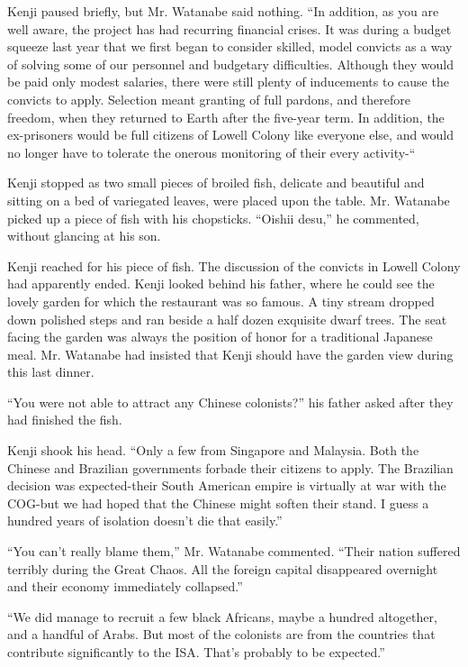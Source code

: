 \documentclass[]{article}
\begin{document}
{Kenji paused briefly, but Mr. Watanabe said nothing. “In addition, as you are well aware, the project has had recurring financial crises. It was during a budget squeeze last year that we first began to consider skilled, model convicts as a way of solving some of our personnel and budgetary difficulties. Although they would be paid only modest salaries, there were still plenty of inducements to cause the convicts to apply. Selection meant granting of full pardons, and therefore freedom, when they returned to Earth after the five-year term. In addition, the ex-prisoners would be full citizens of Lowell Colony like everyone else, and would no longer have to tolerate the onerous monitoring of their every activity-“

Kenji stopped as two small pieces of broiled fish, delicate and beautiful and sitting on a bed of variegated leaves, were placed upon the table. Mr. Watanabe picked up a piece of fish with his chopsticks. “Oishii desu,” he commented, without glancing at his son.

Kenji reached for his piece of fish. The discussion of the convicts in Lowell Colony had apparently ended. Kenji looked behind his father, where he could see the lovely garden for which the restaurant was so famous. A tiny stream dropped down polished steps and ran beside a half dozen exquisite dwarf trees. The seat facing the garden was always the position of honor for a traditional Japanese meal. Mr. Watanabe had insisted that Kenji should have the garden view during this last dinner.

“You were not able to attract any Chinese colonists?” his father asked after they had finished the fish.

Kenji shook his head. “Only a few from Singapore and Malaysia. Both the Chinese and Brazilian governments forbade their citizens to apply. The Brazilian decision was expected-their South American empire is virtually at war with the COG-but we had hoped that the Chinese might soften their stand. I guess a hundred years of isolation doesn’t die that easily.”

“You can’t really blame them,” Mr. Watanabe commented. “Their nation suffered terribly during the Great Chaos. All the foreign capital disappeared overnight and their economy immediately collapsed.”

“We did manage to recruit a few black Africans, maybe a hundred altogether, and a handful of Arabs. But most of the colonists are from the countries that contribute significantly to the ISA. That’s probably to be expected.”

}
\end{document}
